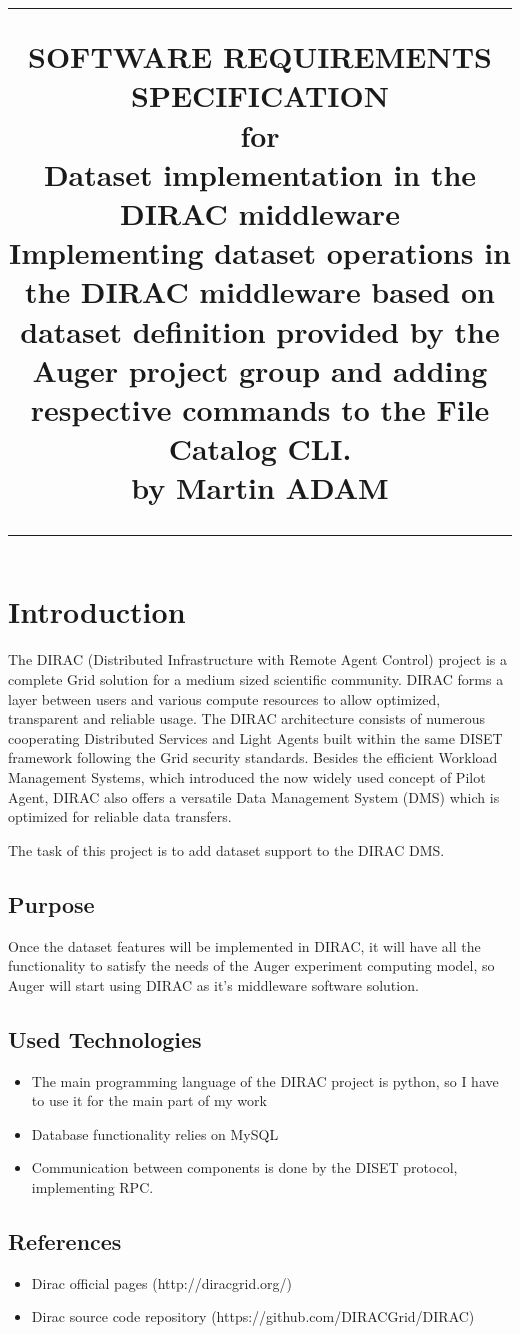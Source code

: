\documentclass{scrreprt}
\title{%
\flushright
\rule{16cm}{5pt}\vskip1cm
\Huge{SOFTWARE REQUIREMENTS SPECIFICATION}\\
\vspace{2cm}
for\\
\vspace{1cm}
Dataset implementation in the DIRAC middleware\\
\vspace{1cm}
\vspace{2cm}
\LARGE{Implementing dataset operations in the DIRAC middleware based on dataset definition provided by the Auger project group and adding respective commands to the File Catalog CLI.\\}
\vspace{2cm}
by Martin ADAM\\
\vfill
\rule{16cm}{5pt}
}
\date{}
\begin{document}
\maketitle
\tableofcontents
\chapter{Introduction}
The DIRAC (Distributed Infrastructure with Remote Agent Control) project is a complete Grid solution for a medium sized scientific community. DIRAC forms a layer between users and various compute resources to allow optimized, transparent and reliable usage. The DIRAC architecture consists of numerous cooperating Distributed Services and Light Agents built within the same DISET framework following the Grid security standards. Besides the efficient Workload Management Systems, which introduced the now widely used concept of Pilot Agent, DIRAC also offers a versatile Data Management System (DMS) which is optimized for reliable data transfers. 

The task of this project is to add dataset support to the DIRAC DMS.


\section{Purpose}
Once the dataset features will be implemented in DIRAC, it will have all the functionality to satisfy the needs of the Auger experiment computing model, so Auger will start using DIRAC as it's middleware software solution.


\section{Used Technologies}

\begin{itemize}
\item The main programming language of the DIRAC project is python, so I have to use it for the main part of my work
\item Database functionality relies on MySQL
\item Communication between components is done by the DISET protocol, implementing RPC.
\end{itemize}


\section{References}
\begin{itemize}
\item Dirac official pages (http://diracgrid.org/)
\item Dirac source code repository (https://github.com/DIRACGrid/DIRAC)
\end{itemize}
\end{document}
